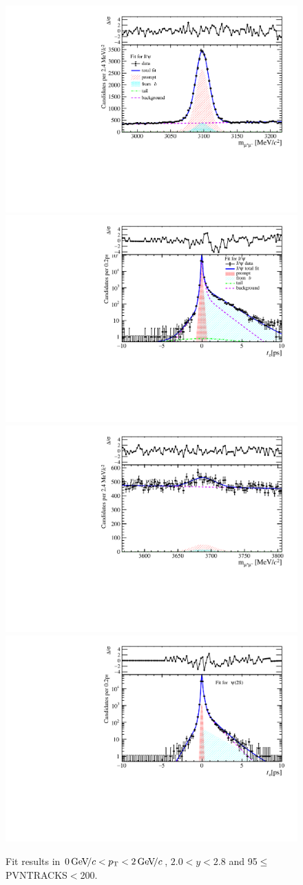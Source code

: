 \begin{figure}[H]
\begin{center}
\includegraphics[width=0.47\linewidth]{pdf/Jpsi/drawmass/n5y1pt1.pdf}
\includegraphics[width=0.47\linewidth]{pdf/Jpsi/2DFit/n5y1pt1.pdf}
\vspace*{-0.5cm}
\includegraphics[width=0.47\linewidth]{pdf/Psi2S/drawmass/n5y1pt1.pdf}
\includegraphics[width=0.47\linewidth]{pdf/Psi2S/2DFit/n5y1pt1.pdf}
\vspace*{-0.5cm}
\end{center}
\caption{Fit results in $0\text{\,Ge\kern -0.1em V\!/}c<p_{\mathrm{T}}<2\text{\,Ge\kern -0.1em V\!/}c$, $2.0<y<2.8$ and 95$\leq$PVNTRACKS$<$200.}
\label{Fitn5y1pt1}
\end{figure}
